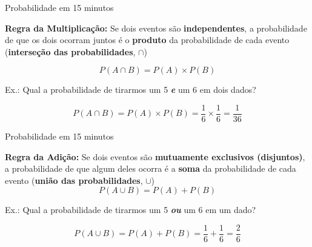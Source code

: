 \documentclass{beamer}\usepackage[]{graphicx}\usepackage[]{color}
\begin{document}
\begin{frame}{Probabilidade em 15 minutos}

\textbf{Regra da Multiplicação:} Se dois eventos são \textbf{independentes}, a probabilidade de que os dois ocorram juntos é o \textbf{produto} da probabilidade de cada evento (\textbf{interseção das probabilidades}, $\cap$)

\begin{equation*}
    P(A \cap B) = P(A) \times P(B)
\end{equation*}

\alert{Ex.:} Qual a probabilidade de tirarmos um 5 \textbf{\emph{e}} um 6 em dois dados?


\begin{equation*}
    P(A \cap B) = P(A) \times P(B) = \frac{1}{6} \times \frac{1}{6} = \frac{1}{36}
\end{equation*}



\end{frame} 


\begin{frame}{Probabilidade em 15 minutos}

\textbf{Regra da Adição:} Se dois eventos são \textbf{mutuamente exclusivos (disjuntos)}, a probabilidade de que algum deles ocorra é a \textbf{soma} da probabilidade de cada evento (\textbf{união das probabilidades}, $\cup$)
\begin{equation*}
    P(A \cup B) = P(A) + P(B)
\end{equation*}

\alert{Ex.:} Qual a probabilidade de tirarmos um 5 \textbf{\emph{ou}} um 6 em um dado?


\begin{equation*}
    P(A \cup B) = P(A) + P(B) = \frac{1}{6} + \frac{1}{6} = \frac{2}{6}
\end{equation*}



\end{frame} 
\end{document}
